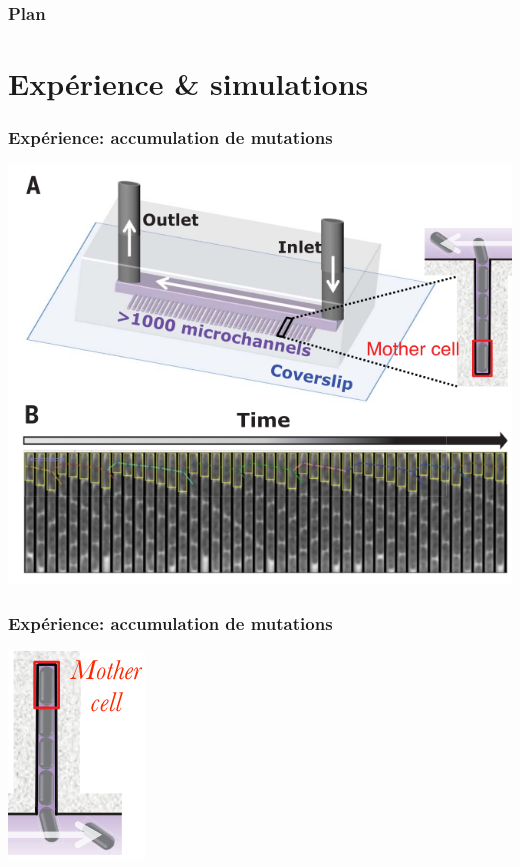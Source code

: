 \documentclass{beamer}
\begin{document}
\begin{frame}
  \frametitle{Plan}
  \tableofcontents
\end{frame}

\section{Expérience \& simulations}
\begin{frame}
  \sectionpage
\end{frame}

\begin{frame}
  \frametitle{Expérience: accumulation de mutations}
  \center\includegraphics[scale=0.3]{../Img/schema_microMA.png}
  \end{frame}

\begin{frame}
  \frametitle{Expérience: accumulation de mutations}
  \includegraphics[scale=0.3]{../Img/Mother_cell.png}
  \end{frame}
\end{document}
